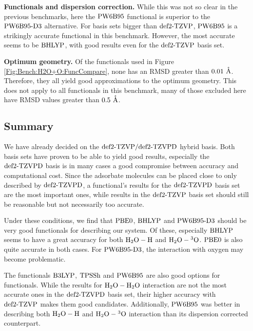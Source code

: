 \documentclass[8.5pt,twoside,twocolumn]{article}
\renewcommand{\Ang}{\mathring{\te{A}}}
\newcommand\kmo{\enmat{\te {kJ/mol}}}
\theoremstyle{standard}
\begin{document}
\textbf{Functionals and dispersion correction.}
While this was not so clear in the previous benchmarks, here the $\text{PW6B95}$
functional is superior to the $\text{PW6B95}\text{-D3}$ alternative. For basis sets
bigger than $\text{def2-TZVP}$, $\text{PW6B95}$ is a strikingly accurate functional in this benchmark.
However, the most accurate seems to be $\text{BHLYP}$, with good results even for
the $\text{def2-TZVP}$ basis set.

\textbf{Optimum geometry.} Of the functionals used in Figure
\ref{Fig:Bench:H2O+O:FuncCompare}, none has an RMSD greater than $0.01\ \Ang$.
Therefore, they all yield good approximations to the optimum geometry. This
does not apply to all functionals in this benchmark, many of those excluded
here have RMSD values greater than $0.5\ \Ang$. 

\subsection{Summary}

We have already decided on the $\text{def2-TZVP}/\text{def2-TZVPD}$ hybrid basis. Both basis sets
have proven to be able to yield good results, especially the $\text{def2-TZVPD}$ basis
is in many cases a good compromise between accuracy and computational cost.
Since the adsorbate molecules can be placed close to only described by $\text{def2-TZVPD}$, a functional's results for
the $\text{def2-TZVPD}$ basis set are the most important ones, while results in the
$\text{def2-TZVP}$ basis set should still be reasonable but not necessarily too accurate.

Under these conditions, we find that $\text{PBE0}$, $\text{BHLYP}$ and $\text{PW6B95}\text{-D3}$ should be
very good functionals for describing our system. Of these, especially $\text{BHLYP}$
seems to have a great accuracy for both $\mbox{\ensuremath{\text H _2 \text O-\text H}}$ and $\mbox{\ensuremath{\text H _2 \text O-\hspace{.2pt} ^3\text{O}}}$. $\text{PBE0}$ is also
quite accurate in both cases. For $\text{PW6B95}\text{-D3}$, the interaction with oxygen
may become problematic. 

The functionals $\text{B3LYP}$, $\text{TPSSh}$ and $\text{PW6B95}$ are also good options for
functionals. While the results for $\mbox{\ensuremath{\text H _2 \text O-\text H _2 \text O}}$ interaction are not the most
accurate ones in the $\text{def2-TZVPD}$ basis set, their higher accuracy with $\text{def2-TZVP}$
makes them good candidates. Additionally, $\text{PW6B95}$ was better in describing both
$\mbox{\ensuremath{\text H _2 \text O-\text H}}$ and $\mbox{\ensuremath{\text H _2 \text O-\hspace{.2pt} ^3\text{O}}}$ interaction than its dispersion corrected counterpart.
\end{document}
